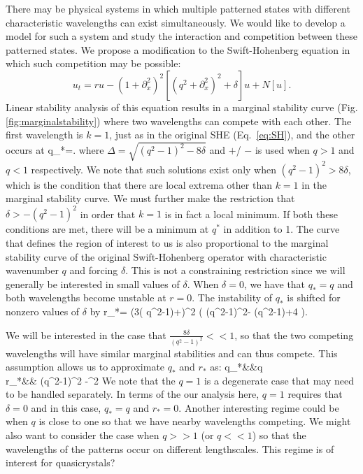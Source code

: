 \documentclass[../main/FlatMarginalStability.tex]{subfiles}
\begin{document}
There may be physical systems in which multiple patterned states with different characteristic wavelengths can exist simultaneously.  We would like to develop a model for such a system and study the interaction and competition between these patterned states.  We propose a modification to the Swift-Hohenberg equation in which such competition may be possible:
\begin{equation}
u_t= r u-\left(1+\partial_{x}^2\right)^2 \left[\left(q^2+\partial_{x}^2\right)^2+\delta \right] u+N[u]\label{eq:SHm}.
\end{equation}
Linear stability analysis of this equation results in a marginal stability curve (Fig. \ref{fig:marginalstability}) where two wavelengths can compete with each other.  The first wavelength is  $k=1$, just as in the original SHE (Eq.~\ref{eq:SH}), and the other occurs at 
\beqn
q_*=.
\eeqn
where $\Delta=\sqrt{(q^2-1)^2-8\delta}$ and $+$/ $-$ is used when $q>1$ and $q<1$ respectively.  We note that such solutions exist only when $(q^2-1)^2>8\delta$, which is the condition that there are  local extrema other than $k=1$ in the marginal stability curve.  We must further make the restriction that $\delta>-(q^2-1)^2$ in order that $k=1$ is in fact a local minimum.  If both these conditions are met, there will be a minimum at $q^*$ in addition to 1.  The curve that defines the region of interest to us is also proportional to the marginal stability curve of the original Swift-Hohenberg operator with characteristic wavenumber $q$ and forcing $\delta$.    This is not a constraining restriction since we will generally be interested in small values of $\delta$.
\FIGmarginalstability
When $\delta=0$, we have that $q_*=q$  and both wavelengths  become unstable at $r=0$. The instability of $q_*$ is shifted for nonzero values of $\delta$ by
\beqn
r_*= \left(3( q^2-1)+\Delta\right)^2 \left( (q^2-1)^2- (q^2-1)\Delta+4 \delta \right).
\eeqn

We will be interested in the case that $\tfrac{8\delta}{(q^2-1)^2}<<1$,  so that the two competing wavelengths will have similar marginal stabilities and can thus compete.  This assumption allows us to approximate $q_*$ and $r_*$ as:
\beqa
q_*&\approx&q \\
r_*&\approx& (q^2-1)^2 \delta-\delta^2
\eeqa
We note that the $q=1$ is a degenerate case that may need to be handled separately.  In terms of the our analysis here, $q=1$ requires that $\delta=0$ and in this case, $q_*=q$ and $r_*=0$.  Another interesting regime could be when $q$ is close to one so that we have nearby wavelengths competing. We might also want to consider the case when $q>>1$ (or $q<<1$) so that the wavelengths of the patterns occur on different lengthscales.  This regime is of interest for quasicrystals?
\end{document}
